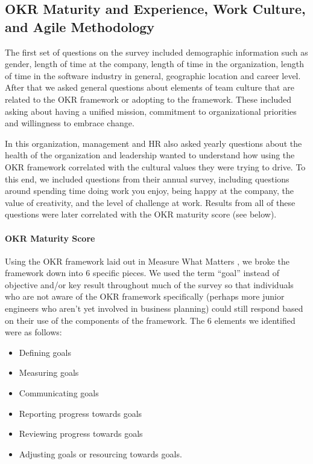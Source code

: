 \documentclass[sigconf, nonacm]{acmart}
\begin{document}
\subsection{OKR Maturity and Experience, Work Culture, and Agile Methodology}
The first set of questions on the survey included demographic information such as gender, length of time at the company, length of time in the organization, length of time in the software industry in general, geographic location and career level. After that we asked general questions about elements of team culture that are related to the OKR framework or adopting to the framework. These included asking about having a unified mission, commitment to organizational priorities and willingness to embrace change. 

In this organization, management and HR also asked yearly questions about the health of the organization and leadership wanted to understand how using the OKR framework correlated with the cultural values they were trying to drive. To this end, we included questions from their annual survey, including questions around spending time doing work you enjoy, being happy at the company, the value of creativity, and the level of challenge at work. Results from all of these questions were later correlated with the OKR maturity score (see below).

\paragraph{OKR Maturity Score}
Using the OKR framework laid out in Measure What Matters \cite{Doerr01}, we broke the framework down into 6 specific pieces. We used the term ``goal'' instead of objective and/or key result throughout much of the survey so that individuals who are not aware of the OKR framework specifically (perhaps more junior engineers who aren't yet involved in business planning) could still respond based on their use of the components of the framework. The 6 elements we identified were as follows:

\begin{itemize}
\item Defining goals
\item Measuring goals
\item Communicating goals
\item Reporting progress towards goals
\item Reviewing progress towards goals
\item Adjusting goals or resourcing towards goals.
\end{itemize}
\end{document}
